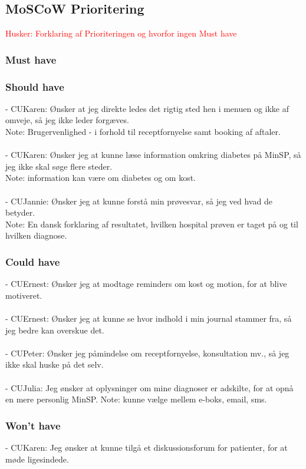 \subsection{MoSCoW Prioritering}
\textcolor{red}{Husker: Forklaring af Prioriteringen og hvorfor ingen Must have}\\
\subsubsection*{Must have}
\subsubsection*{Should have}
- CUKaren: Ønsker at jeg direkte ledes det rigtig sted hen i menuen og ikke af omveje, så jeg ikke leder forgæves. \\
Note: Brugervenlighed - i forhold til receptfornyelse samt booking af aftaler.\\
\\ 
- CUKaren: Ønsker jeg at kunne læse information omkring diabetes på MinSP, så jeg ikke skal søge flere steder. \\
Note: information kan være om diabetes og om kost.\\ 
\\
- CUJannie: Ønsker jeg at kunne forstå min prøvesvar, så jeg ved hvad de betyder. \\
Note: En dansk forklaring af resultatet, hvilken hospital prøven er taget på og til hvilken diagnose.

\subsubsection*{Could have}
- CUErnest: Ønsker jeg at modtage reminders om kost og motion, for at blive motiveret.\\
\\
- CUErnest: Ønsker jeg at kunne se hvor indhold i min journal stammer fra, så jeg bedre kan overskue det.\\
\\
- CUPeter: Ønsker jeg påmindelse om receptfornyelse, konsultation mv., så jeg ikke skal huske på det selv.\\ 
\\
- CUJulia: Jeg ønsker at oplysninger om mine diagnoser er adskilte, for at opnå en mere personlig MinSP.
Note: kunne vælge mellem e-boks, email, sms.\\
\subsubsection*{Won't have}
- CUKaren: Jeg ønsker at kunne tilgå et diskussionsforum for patienter, for at møde ligesindede.\\